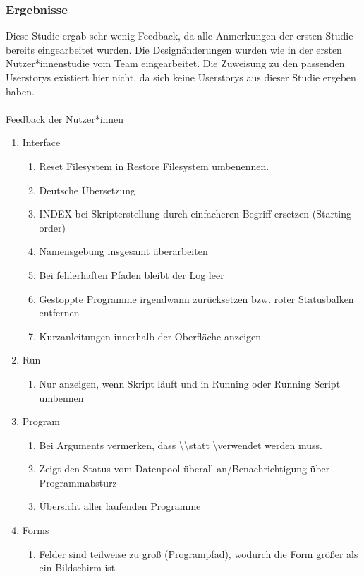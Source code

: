 \subsubsection{Ergebnisse}
Diese Studie ergab sehr wenig Feedback, da alle Anmerkungen der ersten Studie bereits
eingearbeitet wurden. Die Designänderungen wurden wie in der ersten Nutzer*innenstudie
vom Team eingearbeitet. Die Zuweisung zu den passenden Userstorys existiert hier nicht,
da sich keine Userstorys aus dieser Studie ergeben haben.
\\\\
{\large Feedback der Nutzer*innen\\}
\begin{enumerate}
\item Interface
\begin{enumerate}
	\item Reset Filesystem in Restore Filesystem umbenennen.
	\item Deutsche Übersetzung
	\item INDEX bei Skripterstellung durch einfacheren Begriff ersetzen (Starting order)
	\item Namensgebung insgesamt überarbeiten
	\item Bei fehlerhaften Pfaden bleibt der Log leer
	\item Gestoppte Programme irgendwann zurücksetzen bzw. roter Statusbalken entfernen
	\item Kurzanleitungen innerhalb der Oberfläche anzeigen
\end{enumerate}
\item Run
\begin{enumerate}
	\item Nur anzeigen, wenn Skript läuft und in Running oder Running Script umbennen
\end{enumerate}
\item Program
\begin{enumerate}
	\item Bei Arguments vermerken, dass \textbackslash\textbackslash statt \textbackslash verwendet werden muss.
	\item Zeigt den Status vom Datenpool überall an/Benachrichtigung über Programmabsturz
	\item Übersicht aller laufenden Programme
\end{enumerate}
\item Forms
\begin{enumerate}
		\item Felder sind teilweise zu groß (Programpfad), wodurch die Form größer als ein Bildschirm ist
\end{enumerate}
\end{enumerate}
